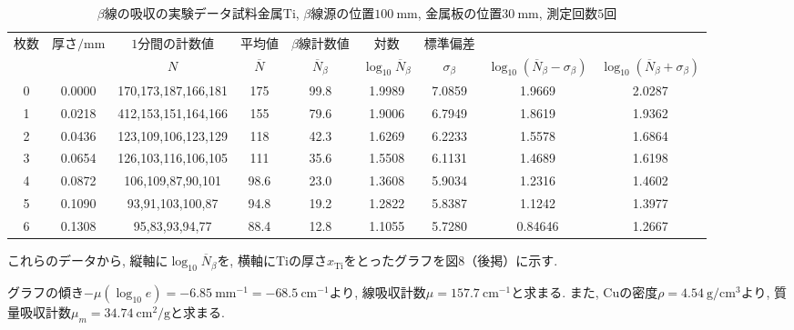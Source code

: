 \documentclass{jarticle}
\begin{document}
\begin{table}[H]
  \caption{$\beta$線の吸収の実験データ\protect\linebreak 試料金属$\mathrm{Ti}$, $\beta$線源の位置$100\ \mathrm{mm}$, 金属板の位置$30\ \mathrm{mm}$, 測定回数$5$回}
  \label{tb:absorption-Ti}
  \small
  \hspace{-3.3cm}
  \begin{tabular}{ccccccccc}
    \hline
    枚数 & 厚さ$/\mathrm{mm}$ & $1$分間の計数値 & 平均値 & $\beta$線計数値 & 対数 & 標準偏差 & & \\
    & & $N$ & $\overline{N}$ & $\overline{N}_\beta$ & $\log_{10} \overline{N}_\beta$ & $\sigma_\beta$ & $\log_{10} (\overline{N}_\beta - \sigma_\beta)$ & $\log_{10} (\overline{N}_\beta + \sigma_\beta)$ \\
    \hline
    0 & 0.0000 & 170,173,187,166,181 & 175 & 99.8 & 1.9989 & 7.0859 & 1.9669 & 2.0287 \\
    1 & 0.0218 & 412,153,151,164,166 & 155 & 79.6 & 1.9006 & 6.7949 & 1.8619 & 1.9362 \\
    2 & 0.0436 & 123,109,106,123,129 & 118 & 42.3 & 1.6269 & 6.2233 & 1.5578 & 1.6864 \\
    3 & 0.0654 & 126,103,116,106,105 & 111 & 35.6 & 1.5508 & 6.1131 & 1.4689 & 1.6198 \\
    4 & 0.0872 & 106,109,87,90,101 & 98.6 & 23.0 & 1.3608 & 5.9034 & 1.2316 & 1.4602 \\
    5 & 0.1090 & 93,91,103,100,87 & 94.8 & 19.2 & 1.2822 & 5.8387 & 1.1242 & 1.3977 \\
    6 & 0.1308 & 95,83,93,94,77 & 88.4 & 12.8 & 1.1055 & 5.7280 & 0.84646 & 1.2667 \\
    \hline
  \end{tabular}
\end{table}

これらのデータから, 縦軸に$\log_{10}\overline{N}_\beta$を, 横軸に$\mathrm{Ti}$の厚さ$x_\mathrm{Ti}$をとったグラフを図8（後掲）に示す.


グラフの傾き$-\mu(\log_{10}e)=-6.85\ \mathrm{mm}^{-1}=-68.5\ \mathrm{cm}^{-1}$より, 線吸収計数$\mu=157.7\ \mathrm{cm}^{-1}$と求まる.
また, $\mathrm{Cu}$の密度$\rho=4.54\ \mathrm{g}/\mathrm{cm}^3$\cite{金属の密度}より, 質量吸収計数$\mu_m=34.74\ \mathrm{cm}^2/\mathrm{g}$と求まる.
\end{document}
